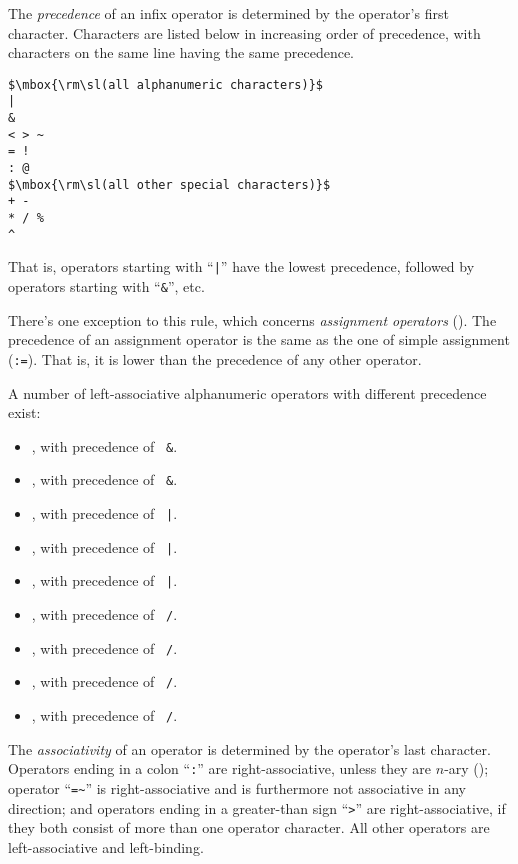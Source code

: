 The {\em precedence} of an infix operator is determined by the operator's first character. Characters are listed below in increasing order of precedence, with characters on the same line having the same precedence.

\begin{lstlisting}
$\mbox{\rm\sl(all alphanumeric characters)}$
|
&
< > ~
= !
: @
$\mbox{\rm\sl(all other special characters)}$
+ -
* / %
^
\end{lstlisting}

That is, operators starting with ``\lstinline!|!'' have the lowest precedence, followed by operators starting with ``\lstinline!&!'', etc. 

There's one exception to this rule, which concerns {\em assignment operators} (). The precedence of an assignment operator is the same as the one of simple assignment (\lstinline!:=!). That is, it is lower than the precedence of any other operator. 

A number of left-associative alphanumeric operators with different precedence exist:
\begin{itemize}
  \item {}, with precedence of ~\lstinline!&!. 
  \item {}, with precedence of ~\lstinline!&!. 
  \item {}, with precedence of ~\lstinline!|!.  
  \item {}, with precedence of ~\lstinline!|!.  
  \item {}, with precedence of ~\lstinline!|!.  
  \item {}, with precedence of ~\lstinline!/!. 
  \item {}, with precedence of ~\lstinline!/!. 
  \item {}, with precedence of ~\lstinline!/!. 
  \item {}, with precedence of ~\lstinline!/!.   
\end{itemize}

The {\em associativity} of an operator is determined by the operator's last character. Operators ending in a colon ``\lstinline!:!'' are right-associative, unless they are $n$-ary (); operator ``\lstinline!=~!'' is right-associative and is furthermore not associative in any direction; and operators ending in a greater-than sign ``\lstinline!>!'' are right-associative, if they both consist of more than one operator character. All other operators are left-associative and left-binding. 

